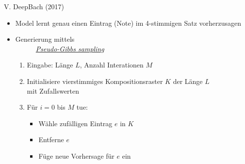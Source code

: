 \begin{frame}{V. \dimFiveTitle}{DeepBach (2017)}
	\parbox{.55\textwidth}{
		\begin{itemize}
			\item Model lernt genau einen Eintrag (Note) im 4-stimmigen Satz vorherzusagen
			\item Generierung mittels\\\medskip
			~~~~~~\underline{\emph{Pseudo-Gibbs sampling}} {\footnotesize\citep{GibbsSampling}}
			\begin{enumerate}
				\medskip
				\item Eingabe: Länge $L$, Anzahl Interationen $M$
				\item Initialisiere vierstimmiges Kompositionsraster $K$ der Länge $L$\\mit Zufallswerten
				\item Für $i=0$ bis $M$ tue:
				\begin{itemize}
					\item Wähle zufälligen Eintrag $e$ in $K$
					\item Entferne $e$
					\item Füge neue Vorhersage für $e$ ein 
				\end{itemize} 
			\end{enumerate}
		\end{itemize}
	}

	\centering
	~~~~~~~~~~~~
\end{frame}

